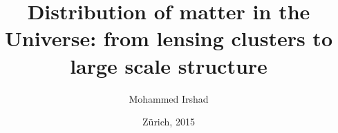 


\title{Distribution of matter in the Universe: from lensing clusters
to  large scale structure}

\author{Mohammed Irshad}






\date{Z\"urich, 2015}

